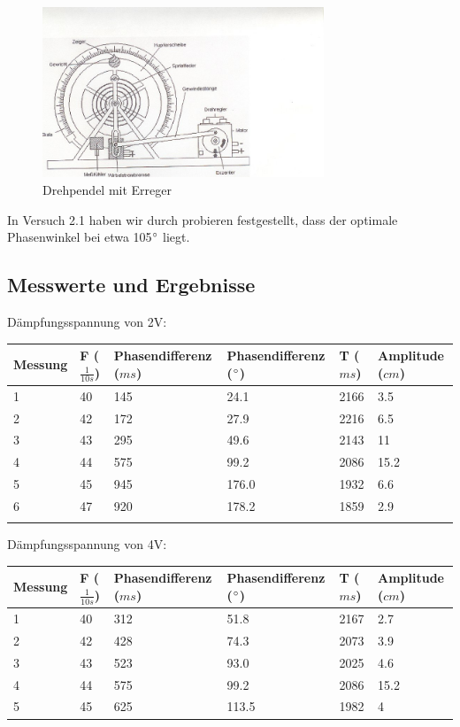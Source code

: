 \documentclass{scrartcl}
\begin{document}
\begin{figure}[h]
  \caption{Drehpendel mit Erreger}
  \centering
    \includegraphics[width=0.75\textwidth]{800px-Pohlsches_Rad}
\end{figure}

In Versuch 2.1 haben wir durch probieren festgestellt, dass der optimale Phasenwinkel bei etwa 105$\degree$ liegt. 
\subsection{Messwerte und Ergebnisse}
Dämpfungsspannung von 2V:\\
\begin{tabular}{llllll}
Messung &F ($\frac{1}{10s}$)&Phasendifferenz ($ms$)&Phasendifferenz ($\degree$)&T ($ms$)&Amplitude ($cm$)\\\hline
1&40&145&24.1&2166&3.5\\
2&42&172&27.9&2216&6.5\\
3&43&295&49.6&2143&11\\
4&44&575&99.2&2086&15.2\\
5&45&945&176.0&1932&6.6\\
6&47&920&178.2&1859&2.9\\\\
\end{tabular}

Dämpfungsspannung von 4V:\\
\begin{tabular}{llllll}
Messung &F ($\frac{1}{10s}$)&Phasendifferenz ($ms$)&Phasendifferenz ($\degree$)&T ($ms$)&Amplitude ($cm$)\\\hline
1&40&312&51.8&2167&2.7\\
2&42&428&74.3&2073&3.9\\
3&43&523&93.0&2025&4.6\\
4&44&575&99.2&2086&15.2\\
5&45&625&113.5&1982&4\\
\end{tabular}
\end{document}
